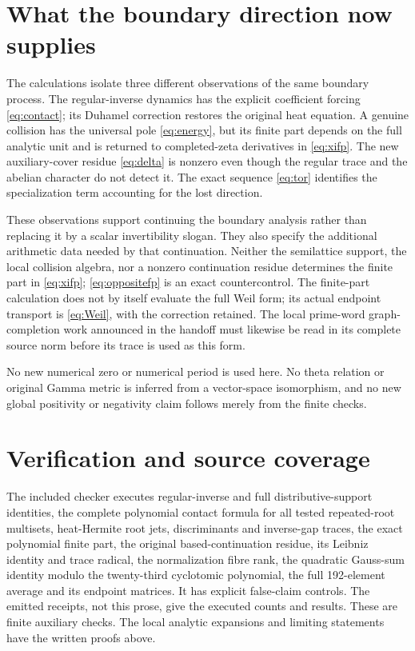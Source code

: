 \documentclass[11pt,a4paper]{article}
\theoremstyle{definition}
\begin{document}
\section{What the boundary direction now supplies}
The calculations isolate three different observations of the same boundary process. The regular-inverse dynamics has the explicit coefficient forcing \eqref{eq:contact}; its Duhamel correction restores the original heat equation. A genuine collision has the universal pole \eqref{eq:energy}, but its finite part depends on the full analytic unit and is returned to completed-zeta derivatives in \eqref{eq:xifp}. The new auxiliary-cover residue \eqref{eq:delta} is nonzero even though the regular trace and the abelian character do not detect it. The exact sequence \eqref{eq:tor} identifies the specialization term accounting for the lost direction.

These observations support continuing the boundary analysis rather than replacing it by a scalar invertibility slogan. They also specify the additional arithmetic data needed by that continuation. Neither the semilattice support, the local collision algebra, nor a nonzero continuation residue determines the finite part in \eqref{eq:xifp}; \eqref{eq:oppositefp} is an exact countercontrol. The finite-part calculation does not by itself evaluate the full Weil form; its actual endpoint transport is \eqref{eq:Weil}, with the correction retained. The local prime-word graph-completion work announced in the handoff must likewise be read in its complete source norm before its trace is used as this form.

No new numerical zero or numerical period is used here. No theta relation or original Gamma metric is inferred from a vector-space isomorphism, and no new global positivity or negativity claim follows merely from the finite checks.

\section*{Verification and source coverage}
The included checker executes regular-inverse and full distributive-support identities, the complete polynomial contact formula for all tested repeated-root multisets, heat-Hermite root jets, discriminants and inverse-gap traces, the exact polynomial finite part, the original based-continuation residue, its Leibniz identity and trace radical, the normalization fibre rank, the quadratic Gauss-sum identity modulo the twenty-third cyclotomic polynomial, the full 192-element average and its endpoint matrices. It has explicit false-claim controls. The emitted receipts, not this prose, give the executed counts and results. These are finite auxiliary checks. The local analytic expansions and limiting statements have the written proofs above.
\end{document}
